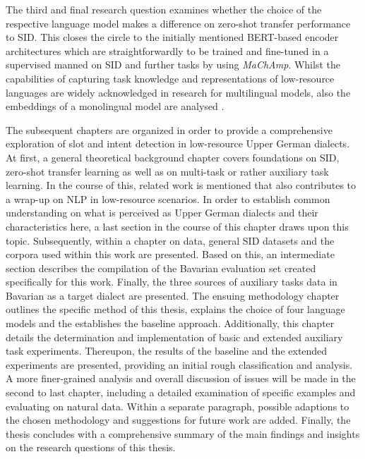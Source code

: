 \documentclass[11pt,a4paper,twoside,openright]{scrbook}
\begin{document}
The third and final research question examines whether the choice of the respective language model makes a difference on zero-shot transfer performance to SID. This closes the circle to the initially mentioned BERT-based encoder architectures which are straightforwardly to be trained and fine-tuned in a supervised manned on SID and further  tasks by using \textit{MaChAmp}. Whilst the capabilities of capturing task knowledge and representations of low-resource languages are widely acknowledged in research for multilingual models, also the embeddings of a monolingual model are analysed \citep{van-der-goot-etal-2021-masked, schuster-etal-2019-cross-lingual}. 

The subsequent chapters are organized in order to provide a comprehensive exploration of slot and intent detection in low-resource Upper German dialects. At first, a general theoretical background chapter covers foundations on SID, zero-shot transfer learning as well as on multi-task or rather auxiliary task learning. In the course of this, related work is mentioned that also contributes to a wrap-up on NLP in low-resource scenarios. In order to establish common understanding on what is perceived as Upper German dialects and their characteristics here, a last section in the course of this chapter draws upon this topic. Subsequently, within a chapter on data, general SID datasets and the corpora used within this work are presented. Based on this, an intermediate section describes the compilation of the Bavarian evaluation set created specifically for this work. Finally, the three sources of auxiliary tasks data in Bavarian as a target dialect are presented. The ensuing methodology chapter outlines the specific method of this thesis, explains the choice of four language models and the establishes the baseline approach. Additionally, this chapter details the determination and implementation of basic and extended auxiliary task experiments. Thereupon, the results of the baseline and the extended experiments are presented, providing an initial rough classification and analysis. A more finer-grained analysis and overall discussion of issues will be made in the second to last chapter, including a detailed examination of specific examples and evaluating on natural data. Within a separate paragraph, possible adaptions to the chosen methodology and suggestions for future work are added. Finally, the thesis concludes with a comprehensive summary of the main findings and insights on the research questions of this thesis.
\end{document}
